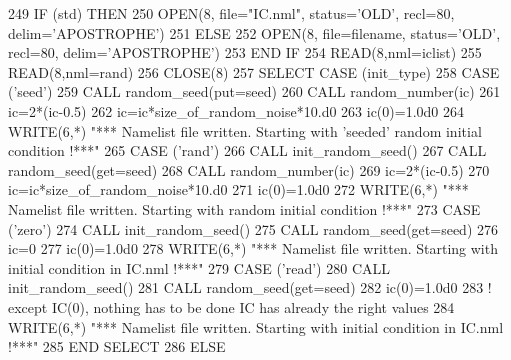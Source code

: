\begin{DoxyCode}
{249       \textcolor{keywordflow}{IF} (std) \textcolor{keywordflow}{THEN}
250         \textcolor{keyword}{OPEN}(8, file=\textcolor{stringliteral}{"IC.nml"}, status=\textcolor{stringliteral}{'OLD'}, recl=80, delim=\textcolor{stringliteral}{'APOSTROPHE'})
251       \textcolor{keywordflow}{ELSE}
252         \textcolor{keyword}{OPEN}(8, file=filename, status=\textcolor{stringliteral}{'OLD'}, recl=80, delim=\textcolor{stringliteral}{'APOSTROPHE'})
253 \textcolor{keywordflow}{      END IF}
254       \textcolor{keyword}{READ}(8,nml=iclist)
255       \textcolor{keyword}{READ}(8,nml=rand)
256       \textcolor{keyword}{CLOSE}(8)
257       \textcolor{keywordflow}{SELECT CASE} (init\_type)
258         \textcolor{keywordflow}{CASE} (\textcolor{stringliteral}{'seed'})
259           \textcolor{keyword}{CALL }random\_seed(put=seed)
260           \textcolor{keyword}{CALL }random\_number(ic)
261           ic=2*(ic-0.5)
262           ic=ic*size\_of\_random\_noise*10.d0
263           ic(0)=1.0d0
264           \textcolor{keyword}{WRITE}(6,*) \textcolor{stringliteral}{"*** Namelist file written. Starting with 'seeded' random initial condition !***"}
265         \textcolor{keywordflow}{CASE} (\textcolor{stringliteral}{'rand'})
266           \textcolor{keyword}{CALL }init\_random\_seed()
267           \textcolor{keyword}{CALL }random\_seed(get=seed)
268           \textcolor{keyword}{CALL }random\_number(ic)
269           ic=2*(ic-0.5)
270           ic=ic*size\_of\_random\_noise*10.d0
271           ic(0)=1.0d0
272           \textcolor{keyword}{WRITE}(6,*) \textcolor{stringliteral}{"*** Namelist file written. Starting with random initial condition !***"}
273         \textcolor{keywordflow}{CASE} (\textcolor{stringliteral}{'zero'})
274           \textcolor{keyword}{CALL }init\_random\_seed()
275           \textcolor{keyword}{CALL }random\_seed(get=seed)
276           ic=0
277           ic(0)=1.0d0
278           \textcolor{keyword}{WRITE}(6,*) \textcolor{stringliteral}{"*** Namelist file written. Starting with initial condition in IC.nml !***"}
279         \textcolor{keywordflow}{CASE} (\textcolor{stringliteral}{'read'})
280           \textcolor{keyword}{CALL }init\_random\_seed()
281           \textcolor{keyword}{CALL }random\_seed(get=seed)
282           ic(0)=1.0d0
283           \textcolor{comment}{! except IC(0), nothing has to be done IC has already the right values}
284           \textcolor{keyword}{WRITE}(6,*) \textcolor{stringliteral}{"*** Namelist file written. Starting with initial condition in IC.nml !***"}
285 \textcolor{keywordflow}{      END SELECT}
286     \textcolor{keywordflow}{ELSE}
}
\end{DoxyCode}
